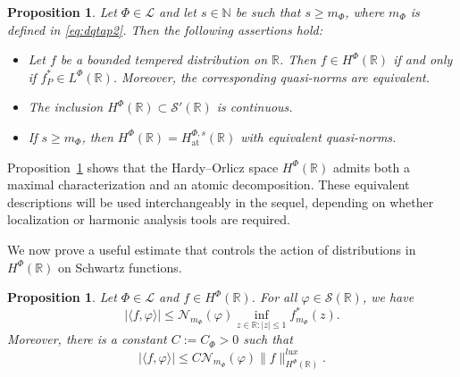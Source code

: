 \documentclass[a4paper,12pt,intlimits,oneside]{amsart}
\newtheorem{proposition}[theorem]{Proposition}
\theoremstyle{definition}
\numberwithin{equation}{section}
\theoremstyle{definition}
\begin{document}
\begin{proposition}\label{pro:mainamp}
Let $\Phi \in \mathscr{L}$ and let $s \in \mathbb{N}$ be such that $s \geq m_{\Phi}$, where $m_{\Phi}$ is defined in \eqref{eq:dqtap2}. Then the following assertions hold:
\begin{itemize}
\item[(i)] Let $f$ be a bounded tempered distribution on $\mathbb{R}$. Then $f \in H^{\Phi}(\mathbb{R})$ if and only if $f_P^* \in L^{\Phi}(\mathbb{R})$. Moreover, the corresponding quasi-norms are equivalent.

\item[(ii)] The inclusion $H^{\Phi}(\mathbb{R}) \subset \mathscr{S}'(\mathbb{R})$ is continuous.
\item[(iii)] If $s \geq m_{\Phi}$, then $H^{\Phi}(\mathbb{R}) = H^{\Phi,s}_{\mathrm{at}}(\mathbb{R})$
with equivalent quasi-norms.
\end{itemize}
\end{proposition}


\medskip

\noindent
Proposition~\ref{pro:mainamp} shows that the Hardy--Orlicz space $H^{\Phi}(\mathbb{R})$ admits both a maximal characterization and an atomic decomposition. These equivalent descriptions will be used interchangeably in the sequel, depending on whether localization or harmonic analysis tools are required.


\medskip

\noindent
We now prove a useful estimate that controls the action of distributions in $H^{\Phi}(\mathbb{R})$ on Schwartz functions. 

\begin{proposition}\label{pro:maaqqaq5}
Let  $\Phi \in \mathscr{L}$ and  $f \in H^{\Phi}(\mathbb{R})$. For all  $\varphi \in \mathscr{S}(\mathbb{R})$, we have
\begin{equation}\label{eq:tqa2}
|\langle f, \varphi\rangle| \leq \mathcal{N}_{m_{\Phi}}(\varphi)\inf_{z \in \mathbb{R}:|z| \leq 1}f_{m_{\Phi}}^{*}(z). 
  \end{equation}
Moreover,  there is a constant $C:=C_{\Phi}>0$ such that
\begin{equation}\label{eq:tqqaa2}
|\langle f, \varphi\rangle| \leq C \mathcal{N}_{m_{\Phi}}(\varphi)\|f\|_{H^{\Phi}(\mathbb{R})}^{lux}. 
  \end{equation}
\end{proposition}
\end{document}

